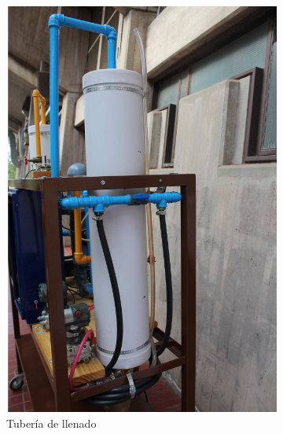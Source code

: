 \begin{figure}[t]
        \centering
        \begin{subfigure}[b]{0.40\textwidth}
\includegraphics[width=\textwidth]
	{Cap2-DisenoEnsamblado/images/caneria1.JPG}
	\caption{Tubería de llenado}
        \end{subfigure}%
        \hfill
        \begin{subfigure}[b]{0.40\textwidth}

\end{subfigure}
\end{figure}
